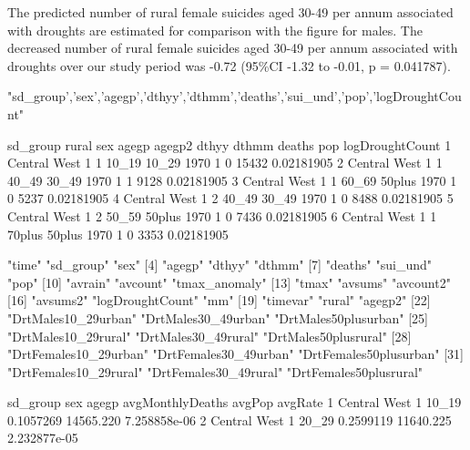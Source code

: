 \documentclass[a4paper]{article}                %
\begin{document}
The predicted number of rural female suicides aged 30-49 per annum associated with droughts are estimated for comparison with the figure for males. The decreased number of rural female suicides aged 30-49 per annum associated with droughts over our study period was -0.72 (95\%CI -1.32 to -0.01,  p = 0.041787).
\begin{Schunk}
\begin{Soutput}
[1] "sd_group','sex','agegp','dthyy','dthmm','deaths','sui_und','pop','logDroughtCount"
\end{Soutput}
\begin{Soutput}
      sd_group rural sex  agegp agegp2 dthyy dthmm deaths   pop logDroughtCount
1 Central West     1   1  10_19  10_29  1970     1      0 15432      0.02181905
2 Central West     1   1  40_49  30_49  1970     1      1  9128      0.02181905
3 Central West     1   1  60_69 50plus  1970     1      0  5237      0.02181905
4 Central West     1   2  40_49  30_49  1970     1      0  8488      0.02181905
5 Central West     1   2  50_59 50plus  1970     1      0  7436      0.02181905
6 Central West     1   1 70plus 50plus  1970     1      0  3353      0.02181905
\end{Soutput}
\begin{Soutput}
 [1] "time"                  "sd_group"              "sex"                  
 [4] "agegp"                 "dthyy"                 "dthmm"                
 [7] "deaths"                "sui_und"               "pop"                  
[10] "avrain"                "avcount"               "tmax_anomaly"         
[13] "tmax"                  "avsums"                "avcount2"             
[16] "avsums2"               "logDroughtCount"       "mm"                   
[19] "timevar"               "rural"                 "agegp2"               
[22] "DrtMales10_29urban"    "DrtMales30_49urban"    "DrtMales50plusurban"  
[25] "DrtMales10_29rural"    "DrtMales30_49rural"    "DrtMales50plusrural"  
[28] "DrtFemales10_29urban"  "DrtFemales30_49urban"  "DrtFemales50plusurban"
[31] "DrtFemales10_29rural"  "DrtFemales30_49rural"  "DrtFemales50plusrural"
\end{Soutput}
\begin{Soutput}
      sd_group sex agegp avgMonthlyDeaths    avgPop      avgRate
1 Central West   1 10_19        0.1057269 14565.220 7.258858e-06
2 Central West   1 20_29        0.2599119 11640.225 2.232877e-05

\end{Soutput}
\end{Schunk}
\end{document}
